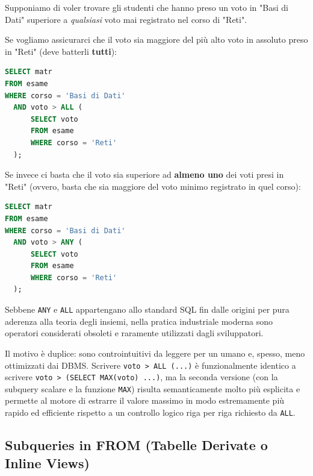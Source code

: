 \begin{example}
Supponiamo di voler trovare gli studenti che hanno preso un voto in "Basi di Dati" superiore a \textit{qualsiasi} voto mai registrato nel corso di "Reti". 

Se vogliamo assicurarci che il voto sia maggiore del più alto voto in assoluto preso in "Reti" (deve batterli \textbf{tutti}):
\begin{lstlisting}[language=SQL, basicstyle=\ttfamily\small, keywordstyle=\color{blue}\bfseries]
SELECT matr
FROM esame
WHERE corso = 'Basi di Dati' 
  AND voto > ALL (
      SELECT voto
      FROM esame
      WHERE corso = 'Reti'
  );
\end{lstlisting}

Se invece ci basta che il voto sia superiore ad \textbf{almeno uno} dei voti presi in "Reti" (ovvero, basta che sia maggiore del voto minimo registrato in quel corso):
\begin{lstlisting}[language=SQL, basicstyle=\ttfamily\small, keywordstyle=\color{blue}\bfseries]
SELECT matr
FROM esame
WHERE corso = 'Basi di Dati' 
  AND voto > ANY (
      SELECT voto
      FROM esame
      WHERE corso = 'Reti'
  );
\end{lstlisting}
\end{example}

\begin{bestpractice}
Sebbene \texttt{ANY} e \texttt{ALL} appartengano allo standard SQL fin dalle origini per pura aderenza alla teoria degli insiemi, nella pratica industriale moderna sono operatori considerati obsoleti e raramente utilizzati dagli sviluppatori. 

Il motivo è duplice: sono controintuitivi da leggere per un umano e, spesso, meno ottimizzati dai DBMS. Scrivere \texttt{voto > ALL (...)} è funzionalmente identico a scrivere \texttt{voto > (SELECT MAX(voto) ...)}, ma la seconda versione (con la subquery scalare e la funzione \texttt{MAX}) risulta semanticamente molto più esplicita e permette al motore di estrarre il valore massimo in modo estremamente più rapido ed efficiente rispetto a un controllo logico riga per riga richiesto da \texttt{ALL}.
\end{bestpractice}

\subsection{Subqueries in FROM (Tabelle Derivate o Inline Views)}

